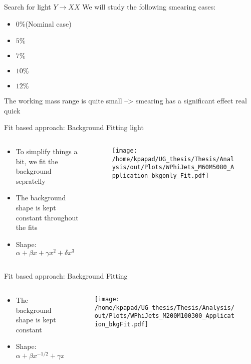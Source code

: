 \documentclass[bigger]{beamer}
\begin{document}
\begin{frame}[label={sec:org9a8869c}]{Search for light \(Y \rightarrow XX\)}
We will study the following smearing cases:
\begin{itemize}
\item \(0\%\)(Nominal case)
\item \(5\%\)
\item \(7\%\)
\item \(10\%\)
\item \(12\%\)
\end{itemize}
The working mass range is quite small --> smearing has a significant effect real quick 
\end{frame}
\begin{frame}[label={sec:org0ad142c}]{Fit based approach: Background Fitting light}
\begin{columns}
\begin{column}{0.5\columnwidth}
\begin{itemize}
\item To simplify things a bit, we fit the background sepratelly
\item The background shape is kept constant throughout the fits
\item Shape: \(\alpha + \beta x + \gamma x^2 + \delta x^3\)
\end{itemize}
\end{column}
\begin{column}{0.5\columnwidth}
\begin{figure}[h]
\centering
\texttt{[image: /home/kpapad/UG\_thesis/Thesis/Analysis/out/Plots/WPhiJets\_M60M5080\_Application\_bkgonly\_Fit.pdf]}
\end{figure}
\end{column}
\end{columns}
\end{frame}

\begin{frame}[label={sec:org387b4cc}]{Fit based approach: Background Fitting}
\begin{columns}
\begin{column}{0.5\columnwidth}
\begin{itemize}
\item The background shape is kept constant
\item Shape: \(\alpha + \beta x^{-1/2} + \gamma x^{-1} + \delta x^{3/2}\)
\end{itemize}
\end{column}
\begin{column}{0.5\columnwidth}
\begin{figure}[h]
\centering
\texttt{[image: /home/kpapad/UG\_thesis/Thesis/Analysis/out/Plots/WPhiJets\_M200M100300\_Application\_bkgFit.pdf]}
\end{figure}
\end{column}
\end{columns}
\end{frame}
\end{document}
